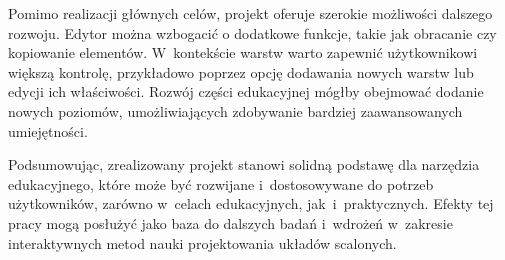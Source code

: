 Pomimo realizacji głównych celów,
projekt oferuje szerokie możliwości dalszego rozwoju.
Edytor można wzbogacić o dodatkowe funkcje,
takie jak obracanie czy kopiowanie elementów.
W~kontekście warstw warto zapewnić użytkownikowi większą kontrolę,
przykładowo poprzez opcję dodawania nowych warstw lub edycji ich właściwości.
Rozwój części edukacyjnej mógłby obejmować dodanie nowych poziomów,
umożliwiających zdobywanie bardziej zaawansowanych umiejętności.


Podsumowując, zrealizowany projekt stanowi solidną podstawę dla narzędzia edukacyjnego,
które może być rozwijane i~dostosowywane do potrzeb użytkowników, zarówno w~celach edukacyjnych,
jak~i~praktycznych.
Efekty tej pracy mogą posłużyć jako baza do dalszych badań
i~wdrożeń w~zakresie interaktywnych metod nauki projektowania układów scalonych.

